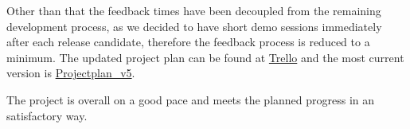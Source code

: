 \documentclass[11pt,twocolumn]{article}
\begin{document}
Other than that the feedback times have been decoupled from the remaining development process, as we decided to have short demo sessions immediately after each release candidate, therefore the feedback process is reduced to a minimum. The updated project plan can be found at \href{https://trello.com/c/ZQKwDSvG}{Trello} and the most current version is \href{https://trello-attachments.s3.amazonaws.com/56c4a277153128da8ebc828c/2215x1098/9ad8a2d9dd43f6fe0c54597f0a8b7a4f/Projectplan_v5.png}{Projectplan\_v5}.

The project is overall on a good pace and meets the planned progress in an satisfactory way.





 
\end{document}
